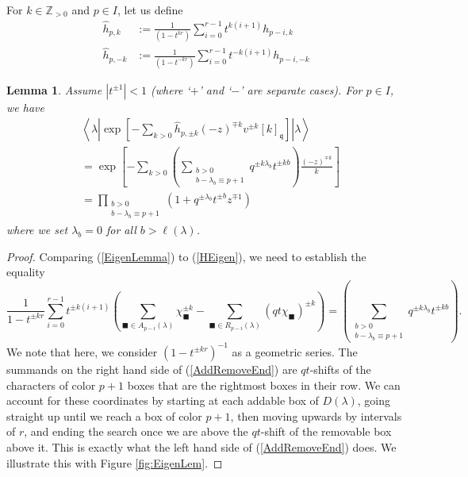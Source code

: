 \documentclass{amsart}
\newcommand{\Z}{\mathbb{Z}}
\newcommand{\qqq}{\mathfrak{q}}
\newtheorem{lem}[thm]{Lemma}
\theoremstyle{remark}
\numberwithin{thm}{section}
\numberwithin{equation}{section}
\begin{document}
For $k\in \Z_{>0}$ and $p\in I$, let us define
\begin{align}
    \label{Hhat+}
    \hat{h}_{p,k}&:=\frac{1}{(1-t^{kr})}\sum_{i=0}^{r-1}t^{ k(i+1)}h_{p-i, k}\\
    \label{Hhat-}
    \hat{h}_{p,-k}&:= \frac{1}{(1-t^{- kr})}\sum_{i=0}^{r-1}t^{- k(i+1)}h_{p-i,- k}
\end{align}
\begin{lem}\label{FockEigen}
Assume $|t^{\pm 1}|<1$ (where `$+$' and `$-$' are separate cases).
For $p\in I$, we have
\begin{equation}
\begin{aligned}
&\left\langle\lambda\left|\exp\left[-\sum_{k>0}\hat{h}_{p,\pm k} (-z)^{\mp k}{v^{\pm k}[ k]_{\qqq}} \right]\right|\lambda\right\rangle\\
&= \exp\left[-\sum_{k>0}\left(\sum_{\substack{b>0\\b-\lambda_b\equiv p+1 }}q^{\pm k\lambda_b}t^{\pm kb}\right)\frac{(-z)^{\mp k}}{k}\right]\\
&= \prod_{\substack{b>0\\b-\lambda_b\equiv p+1 }}\left(1+q^{\pm\lambda_b}t^{\pm b}z^{\mp 1}\right)
\end{aligned}
\label{EigenLemma}
\end{equation}
where we set $\lambda_b=0$ for all $b>\ell(\lambda)$.
\end{lem}

\begin{proof}
Comparing (\ref{EigenLemma}) to (\ref{HEigen}), we need to establish the equality
\begin{equation}
\frac{1}{1-t^{\pm kr}}\sum_{i=0}^{r-1}t^{\pm k(i+1)}\left( \sum_{\blacksquare\in A_{p-i}(\lambda)}\chi_\blacksquare^{\pm k} - \sum_{\blacksquare\in R_{p-i}(\lambda)}(qt\chi_\blacksquare)^{\pm k}\right)
=\left(\sum_{\substack{b>0\\b-\lambda_b\equiv p+1 }}q^{\pm k\lambda_b}t^{\pm kb}\right).
\label{AddRemoveEnd}
\end{equation}
We note that here, we consider $(1-t^{\pm kr})^{-1}$ as a geometric series.
The summands on the right hand side of (\ref{AddRemoveEnd}) are $qt$-shifts of the characters of color $p+1$ boxes that are the rightmost boxes in their row.
We can account for these coordinates by starting at each addable box of $D(\lambda)$, going straight up until we reach a box of color $p+1$, then moving upwards by intervals of $r$, and ending the search once we are above the $qt$-shift of the removable box above it.
This is exactly what the left hand side of (\ref{AddRemoveEnd}) does.
We illustrate this with Figure \ref{fig:EigenLem}.
\end{proof}
\end{document}
